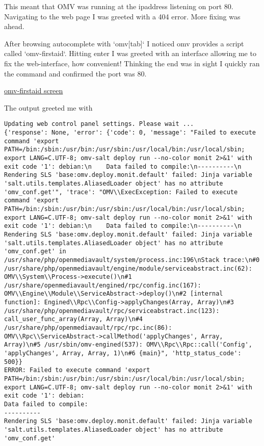 \documentclass[11pt]{article}
\begin{document}
This meant that  OMV was running at  the ipaddress listening
on port 80. Navigating to the  web page I was greeted with a
404  error. More  fixing was  ahead.

After browsing  autocomplete with  `omv[tab]` I  noticed omv
provides a script called `omv-firstaid`. Hitting enter I was
greeted   with  an   interface  allowing   me  to   fix  the
web-interface, how convenient! Thinking  the end was in sight
I quickly ran the command and confirmed the port was 80.

\href{./figures/omv-firstaid.png}{omv-firstaid screen}

The output greeted me with

\begin{verbatim}
Updating web control panel settings. Please wait ...
{'response': None, 'error': {'code': 0, 'message': "Failed to execute command 'export PATH=/bin:/sbin:/usr/bin:/usr/sbin:/usr/local/bin:/usr/local/sbin; export LANG=C.UTF-8; omv-salt deploy run --no-color monit 2>&1' with exit code '1': debian:\n    Data failed to compile:\n----------\n    Rendering SLS 'base:omv.deploy.monit.default' failed: Jinja variable 'salt.utils.templates.AliasedLoader object' has no attribute 'omv_conf.get'", 'trace': "OMV\\ExecException: Failed to execute command 'export PATH=/bin:/sbin:/usr/bin:/usr/sbin:/usr/local/bin:/usr/local/sbin; export LANG=C.UTF-8; omv-salt deploy run --no-color monit 2>&1' with exit code '1': debian:\n    Data failed to compile:\n----------\n    Rendering SLS 'base:omv.deploy.monit.default' failed: Jinja variable 'salt.utils.templates.AliasedLoader object' has no attribute 'omv_conf.get' in /usr/share/php/openmediavault/system/process.inc:196\nStack trace:\n#0 /usr/share/php/openmediavault/engine/module/serviceabstract.inc(62): OMV\\System\\Process->execute()\n#1 /usr/share/openmediavault/engined/rpc/config.inc(167): OMV\\Engine\\Module\\ServiceAbstract->deploy()\n#2 [internal function]: Engined\\Rpc\\Config->applyChanges(Array, Array)\n#3 /usr/share/php/openmediavault/rpc/serviceabstract.inc(123): call_user_func_array(Array, Array)\n#4 /usr/share/php/openmediavault/rpc/rpc.inc(86): OMV\\Rpc\\ServiceAbstract->callMethod('applyChanges', Array, Array)\n#5 /usr/sbin/omv-engined(537): OMV\\Rpc\\Rpc::call('Config', 'applyChanges', Array, Array, 1)\n#6 {main}", 'http_status_code': 500}}
ERROR: Failed to execute command 'export PATH=/bin:/sbin:/usr/bin:/usr/sbin:/usr/local/bin:/usr/local/sbin; export LANG=C.UTF-8; omv-salt deploy run --no-color monit 2>&1' with exit code '1': debian:
Data failed to compile:
----------
Rendering SLS 'base:omv.deploy.monit.default' failed: Jinja variable 'salt.utils.templates.AliasedLoader object' has no attribute 'omv_conf.get'
\end{verbatim}
\end{document}
